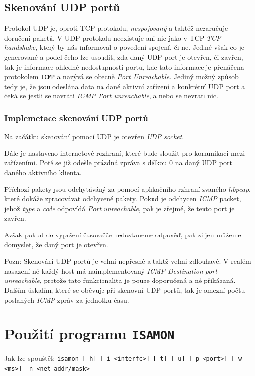\section{Skenování UDP portů}
Protokol UDP je, oproti TCP protokolu, \textit{nespojovaný} a taktéž nezaručuje doručení paketů. V UDP protokolu neexistuje ani nic jako v TCP \textit{TCP handshake}, který by nás informoval o povedení spojení, či ne. Jediné však co je generované a podel čeho lze usoudit, zda daný UDP port je otevřen, či zavřen, tak je informace ohledně nedostupnosti portu, kde tato informace je přenáčena protokolem \texttt{ICMP} a nazývá se obecně \textit{Port Unreachable}\cite{RFC1122}. Jediný možný způsob tedy je, že jsou odeslána data na dané aktivní zařízení a konkrétní UDP port a čeká se jestli se navrátí \textit{ICMP Port unreachable}, a nebo se nevratí nic.

\subsection{Implemetace skenování UDP portů}
Na začátku skenování pomocí UDP je otevřen \textit{UDP socket}.

Dále je nastaveno internetové rozhraní, které bude sloužit pro komunikaci mezi zařízeními. Poté se již odešle prázdná zpráva s délkou 0 na daný UDP port daného aktivního klienta.

Příchozí pakety jsou odchytáváný za pomocí aplikačního rzhraní zvaného \textit{libpcap}, které dokáže zpracovávat odchycené pakety. Pokud je odchycen \textit{ICMP} packet, jehož \textit{type} a \textit{code} odpovídá \textit{Port unreachable}, pak je zřejmé, že tento port je zavřen.

Avšak pokud do vypršení časovačče nedostaneme odpověď, pak si jen můžeme domyslet, že daný port je otevřen.
\newline

Pozn: Skenování UDP portů je velmi nepřesné a taktž velmi zdlouhavé. V realém nasazení né každý host má naimplementovaný \textit{ICMP Destination port unreachable}, protože tato funkcionalita je pouze doporučená a né přikázaná. Dalším úskalím, které se oběvuje při skenovní UDP portů, tak je omezní počtu poslaných \textit{ICMP} zpráv za jednotku času.



\chapter{Použití programu \texttt{ISAMON}}
Jak lze spouštěť:
\newline
\texttt{isamon [-h] [-i <interfc>] [-t] [-u] [-p <port>] [-w <ms>] -n <net\_addr/mask> }


